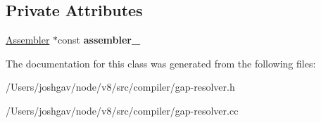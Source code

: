 \subsection*{Private Attributes}
\begin{DoxyCompactItemize}
\item 
\hyperlink{classv8_1_1internal_1_1compiler_1_1_gap_resolver_1_1_assembler}{Assembler} $\ast$const {\bfseries assembler\+\_\+}\hypertarget{classv8_1_1internal_1_1compiler_1_1_gap_resolver_ab92ef3f8c3dffa455e0267398566e5b1}{}\label{classv8_1_1internal_1_1compiler_1_1_gap_resolver_ab92ef3f8c3dffa455e0267398566e5b1}

\end{DoxyCompactItemize}


The documentation for this class was generated from the following files\+:\begin{DoxyCompactItemize}
\item 
/\+Users/joshgav/node/v8/src/compiler/gap-\/resolver.\+h\item 
/\+Users/joshgav/node/v8/src/compiler/gap-\/resolver.\+cc\end{DoxyCompactItemize}
